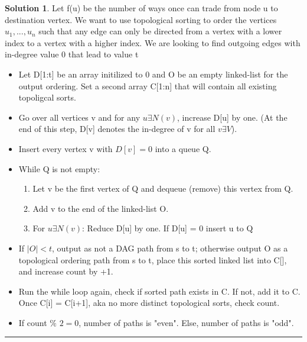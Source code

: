 \documentclass{article}
\theoremstyle{definition}
\def\fline{\rule{0.75\linewidth}{0.5pt}}
\newcommand{\finishline}{\begin{center}\fline\end{center}}
\newtheorem*{solution*}{Solution}
\newenvironment{solution}{\begin{solution*}}{{\finishline} \end{solution*}}
\begin{document}
\bigskip

\begin{solution}
	\item Let f(u) be the number of ways once can trade from node u to destination vertex. We want to use topological sorting to order the vertices $u_1, ..., u_n$ such that any edge can only be directed from a vertex with a lower index to a vertex with a higher index. We are looking to find outgoing edges with in-degree value 0 that lead to value t
	\begin{itemize}
	\item Let D[1:t] be an array initilized to 0 and O be an empty linked-list for the output ordering. Set a second array C[1:n] that will contain all existing topoligcal sorts.
	\item Go over all vertices v and for any $u \exists N(v)$,  increase D[u]  by  one.   (At  the  end  of  this  step, D[v] denotes the in-degree of v for all $v \exists V$).
	\item Insert every vertex v with $D[v] = 0$ into a queue Q.
	\item While Q is not empty:
		\begin{enumerate}
		\item Let v be the first vertex of Q and dequeue (remove) this vertex from Q.
		\item Add v to the end of the linked-list O.
		\item For $u \exists N(v)$: Reduce D[u] by one.  If D[u] = 0 insert u to Q
		\end{enumerate}
	\item If $|O| < t$, output as not a DAG path from s to t; otherwise output O as a topological ordering path from s to t, place this sorted linked list into C[], and increase count by +1.
	\item Run the while loop again, check if sorted path exists in C. If not, add it to C. Once C[i] = C[i+1], aka no more distinct topological sorts, check count.
	\item If count  $\%$ $ 2 = 0$, number of paths is "even". Else, number of paths is "odd".
	\end{itemize}
	

\end{solution}
\end{document}
